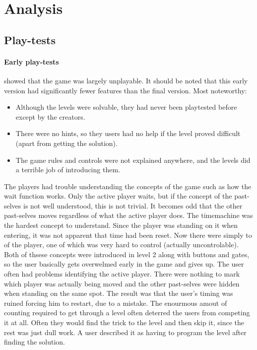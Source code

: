 \section{Analysis}
\subsection{Play-tests}
\label{sec:play-tests}
\paragraph{Early play-tests} showed that the game was largely unplayable. It should be noted that this early version had significantly fewer features than the final version. Most noteworthy:

\begin{itemize}
\item Although the levels were solvable, they had never been playtested before except by the creators.
\item There were no hints, so they users had no help if the level proved difficult (apart from getting the solution).
\item The game rules and controls were not explained anywhere, and the levels did a terrible job of introducing them.
\end{itemize}

The players had trouble understanding the concepts of the game such as how the wait function works. Only the active player waits, but if the concept of the past-selves is not well understood, this is not trivial. It becomes odd that the other past-selves moves regardless of what the active player does. The timemachine was the hardest concept to understand. Since the player was standing on it when entering, it was not apparent that time had been reset. Now there were simply to of the player, one of which was very hard to control (actually uncontrolable). Both of thsese concepts were introduced in level 2 along with buttons and gates, so the user basically gets overwelmed early in the game and gives up.
The user often had problems identifying the active player. There were nothing to mark which player was actually being moved and the other past-selves were hidden when standing on the same spot. The result was that the user's timing was ruined forcing him to restart, due to a mistake.
The enourmous amout of counting required to get through a level often deterred the users from competing it at all. Often they would find the trick to the level and then skip it, since the rest was just  dull work. A user described it as having to program the level after finding the solution.\\

